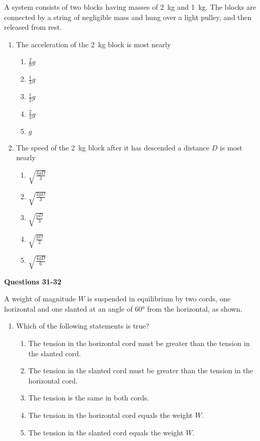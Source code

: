 \documentclass{../../oss-apphys}
\begin{document}
\begin{multicols}{2}
  A system consists of two blocks having masses of \SI{2}{\kilo\gram} and
  \SI{1}{\kilo\gram}. The blocks are connected by a string of negligible mass
  and hung over a light pulley, and then released from rest.
  \begin{center}
  \end{center}
  \begin{enumerate}[resume,leftmargin=18pt]
  \item The acceleration of the \SI{2}{\kilo\gram} block is most nearly
    \begin{enumerate}[noitemsep,topsep=0pt,leftmargin=18pt,label=(\Alph*)]
    \item $\displaystyle\frac{2}{9}g$
    \item $\displaystyle\frac{1}{3}g$
    \item $\displaystyle\frac{1}{2}g$
    \item $\displaystyle\frac{2}{3}g$
    \item $g$
    \end{enumerate}
  \item The speed of the \SI{2}{\kilo\gram} block after it has descended a
    distance $D$ is most nearly
    \begin{enumerate}[noitemsep,topsep=0pt,leftmargin=18pt,label=(\Alph*)]
    \item $\displaystyle\sqrt{\frac{4gD}{3}}$
    \item $\displaystyle\sqrt{\frac{2gD}{3}}$
    \item $\displaystyle\sqrt{\frac{gD}{3}}$
    \item $\displaystyle\sqrt{\frac{gD}{2}}$
    \item $\displaystyle\sqrt{\frac{4gD}{6}}$
    \end{enumerate}
  \end{enumerate}
  \columnbreak
  
  \textbf{Questions 31-32}

  A weight of magnitude $W$ is suspended in equilibrium by two cords, one
  horizontal and one slanted at an angle of \ang{60} from the horizontal, as
  shown.
  \begin{center}
  \end{center}
  \begin{enumerate}[resume,leftmargin=18pt]
  \item Which of the following statements is true?
    \begin{enumerate}[noitemsep,topsep=0pt,leftmargin=18pt,label=(\Alph*)]
    \item The tension in the horizontal cord must be greater than the tension
      in the slanted cord.
    \item The tension in the slanted cord must be greater than the tension in
      the horizontal cord.
    \item The tension is the same in both cords.
    \item The tension in the horizontal cord equals the weight $W$.
    \item The tension in the slanted cord equals the weight $W$.
    \end{enumerate}


\end{enumerate}
\end{multicols}
\end{document}
